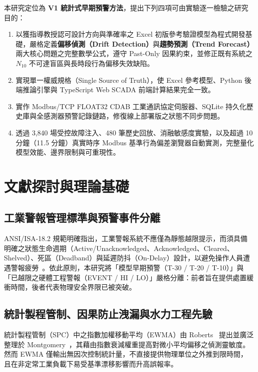 \documentclass[fontset=none, a4paper, 12pt]{ctexart}
\begin{document}
\begin{doublespace}
本研究定位為 \textbf{V1 統計式早期預警方法}，提出下列四項可由實驗逐一檢驗之研究目的：
\begin{enumerate}
    \item 以獲指導教授認可設計方向與準確率之 Excel 初版參考驗證模型為程式開發基礎，嚴格定義\textbf{偏移偵測（Drift Detection）}與\textbf{趨勢預測（Trend Forecast）}兩大核心問題之完整數學公式，遵守 Past-Only 因果約束，並修正既有系統之 $N_{10}$ 不可達盲區與長時段行為偏移失效缺陷。
    \item 實現單一權威規格（Single Source of Truth），使 Excel 參考模型、Python 後端推論引擎與 TypeScript Web SCADA 前端計算結果完全一致。
    \item 實作 Modbus/TCP FLOAT32 CDAB 工業通訊協定伺服器、SQLite 持久化歷史庫與全感測器預警記錄鏈路，修復線上部署版之狀態不同步問題。
    \item 透過 3,840 場受控故障注入、480 筆歷史回放、消融敏感度實驗，以及超過 10 分鐘（11.5 分鐘）真實時序 Modbus 基準行為偏差瀏覽器自動實測，完整量化模型效能、邊界限制與可重現性。
\end{enumerate}

\clearpage
\section{文獻探討與理論基礎}

\subsection{工業警報管理標準與預警事件分離}
ANSI/ISA-18.2 規範明確指出，工業警報系統不應僅為靜態越限提示，而須具備明確之狀態生命週期（Active/Unacknowledged、Acknowledged、Cleared、Shelved）、死區（Deadband）與延遲防抖（On-Delay）設計，以避免操作人員遭遇警報疲勞~\cite{isa1822016}。依此原則，本研究將「模型早期預警（T-30 / T-20 / T-10）」與「已越限之硬體工程警報（EVENT / HI / LO）」嚴格分離：前者旨在提供處置緩衝時間，後者代表物理安全界限已被突破。

\subsection{統計製程管制、因果防止洩漏與水力工程先驗}
統計製程管制（SPC）中之指數加權移動平均（EWMA）由 Roberts~\cite{roberts1959control} 提出並廣泛整理於 Montgomery~\cite{montgomery2020statistical}，其藉由指數衰減權重提高對微小平均偏移之偵測靈敏度。然而 EWMA 僅輸出無因次控制統計量，不直接提供物理單位之外推到限時間，且在非定常工業負載下易受基準漂移影響而升高誤報率。


\end{doublespace}
\end{document}
